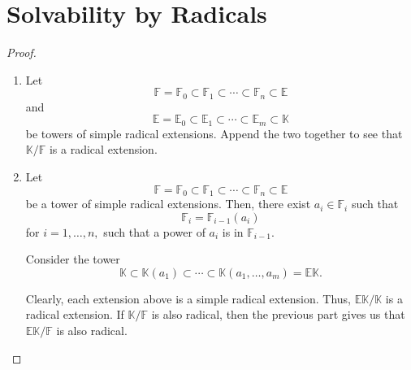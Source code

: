 \section{Solvability by Radicals}

\radextproperties*\label{prop:radextproperties2}
\begin{flushright}\hyperref[prop:radextproperties]{\upsym}\end{flushright}
\begin{proof}
    \phantom{hi}
    \begin{enumerate}
        \item Let
        \begin{equation*} 
            \mathbb{F} = \mathbb{F}_0 \subset \mathbb{F}_1 \subset \cdots \subset \mathbb{F}_n \subset \mathbb{E}
        \end{equation*}
        and
        \begin{equation*} 
            \mathbb{E} = \mathbb{E}_0 \subset \mathbb{E}_1 \subset \cdots \subset \mathbb{E}_m \subset \mathbb{K}
        \end{equation*}
        be towers of simple radical extensions. Append the two together to see that $\mathbb{K}/\mathbb{F}$ is a radical extension.
        \item Let
        \begin{equation*} 
            \mathbb{F} = \mathbb{F}_0 \subset \mathbb{F}_1 \subset \cdots \subset \mathbb{F}_n \subset \mathbb{E}
        \end{equation*}
        be a tower of simple radical extensions. Then, there exist $a_i \in \mathbb{F}_i$ such that
        \begin{equation*} 
            \mathbb{F}_i = \mathbb{F}_{i - 1}(a_i)
        \end{equation*}
        for $i = 1, \ldots, n,$ such that a power of $a_i$ is in $\mathbb{F}_{i - 1}.$

        Consider the tower
        \begin{equation*} 
            \mathbb{K} \subset \mathbb{K}(a_1) \subset \cdots \subset \mathbb{K}(a_1, \ldots, a_m) = \mathbb{E}\mathbb{K}.
        \end{equation*}

        Clearly, each extension above is a simple radical extension. Thus, $\mathbb{E}\mathbb{K}/\mathbb{K}$ is a radical extension. If $\mathbb{K}/\mathbb{F}$ is also radical, then the previous part gives us that $\mathbb{E}\mathbb{K}/\mathbb{F}$ is also radical.
    \end{enumerate}
\end{proof}

